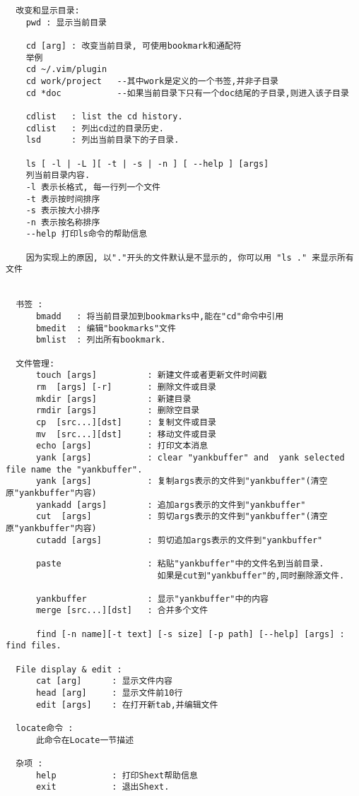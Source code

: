\documentclass[oneside,openany]{book}
\begin{document}
  \begin{verbatim}
  改变和显示目录:
    pwd : 显示当前目录

    cd [arg] : 改变当前目录, 可使用bookmark和通配符
    举例
    cd ~/.vim/plugin
    cd work/project   --其中work是定义的一个书签,并非子目录
    cd *doc           --如果当前目录下只有一个doc结尾的子目录,则进入该子目录

    cdlist   : list the cd history.
    cdlist   : 列出cd过的目录历史.
    lsd      : 列出当前目录下的子目录.

    ls [ -l | -L ][ -t | -s | -n ] [ --help ] [args] 
    列当前目录内容. 
    -l 表示长格式, 每一行列一个文件
    -t 表示按时间排序
    -s 表示按大小排序
    -n 表示按名称排序
    --help 打印ls命令的帮助信息

    因为实现上的原因, 以"."开头的文件默认是不显示的, 你可以用 "ls ." 来显示所有文件


  书签 :
      bmadd   : 将当前目录加到bookmarks中,能在"cd"命令中引用
      bmedit  : 编辑"bookmarks"文件
      bmlist  : 列出所有bookmark.

  文件管理:
      touch [args]          : 新建文件或者更新文件时间戳
      rm  [args] [-r]       : 删除文件或目录
      mkdir [args]          : 新建目录
      rmdir [args]          : 删除空目录
      cp  [src...][dst]     : 复制文件或目录
      mv  [src...][dst]     : 移动文件或目录
      echo [args]           : 打印文本消息
      yank [args]           : clear "yankbuffer" and  yank selected file name the "yankbuffer".
      yank [args]           : 复制args表示的文件到"yankbuffer"(清空原"yankbuffer"内容)
      yankadd [args]        : 追加args表示的文件到"yankbuffer"
      cut  [args]           : 剪切args表示的文件到"yankbuffer"(清空原"yankbuffer"内容)
      cutadd [args]         : 剪切追加args表示的文件到"yankbuffer"

      paste                 : 粘贴"yankbuffer"中的文件名到当前目录.
                              如果是cut到"yankbuffer"的,同时删除源文件.

      yankbuffer            : 显示"yankbuffer"中的内容
      merge [src...][dst]   : 合并多个文件

      find [-n name][-t text] [-s size] [-p path] [--help] [args] : find files.

  File display & edit :
      cat [arg]      : 显示文件内容
      head [arg]     : 显示文件前10行
      edit [args]    : 在打开新tab,并编辑文件

  locate命令 :
      此命令在Locate一节描述

  杂项 :
      help           : 打印Shext帮助信息
      exit           : 退出Shext.
  \end{verbatim}
\end{document}
